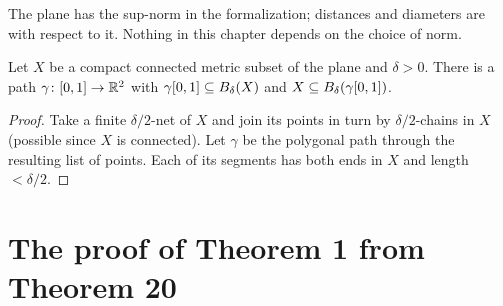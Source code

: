 
The plane has the sup-norm in the formalization; distances and diameters are with respect to it. Nothing in this chapter depends on the
choice of norm.

\begin{lemma}\label{lem:path-approx}
Let $X$ be a compact connected metric subset of the plane and $\delta>0$. There is a path $\gamma\colon[0,1]\to\mathbb{R}^2$ with $\gamma[0,1]\subseteq B_\delta(X)$ and
$X\subseteq B_\delta(\gamma[0,1])$.
\end{lemma}

\begin{proof}
Take a finite $\delta/2$-net of $X$ and join its points in turn by $\delta/2$-chains in $X$ (possible since $X$ is connected). Let $\gamma$ be the
polygonal path through the resulting list of points. Each of its segments has both ends in $X$ and length $<\delta/2$.
\end{proof}


\section{The proof of Theorem 1 from Theorem 20}

